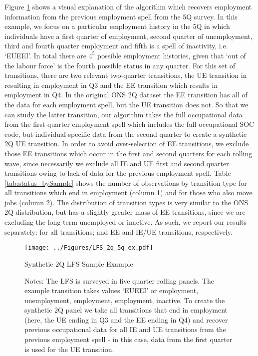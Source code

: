 \documentclass[12pt,authoryear]{elsarticle}
\begin{document}
		\vspace{2mm}
	
Figure \ref{fig:LFS_2q_5q} shows a visual explanation of the algorithm  which recovers employment information from the previous employment spell from the 5Q survey. In this example, we focus on a particular employment history in the 5Q in which individuals have a first quarter of employment, second quarter of unemployment, third and fourth quarter employment and fifth is a spell of inactivity, i.e. `EUEEI'. In total there are $4^5$ possible employment histories, given that `out of the labour force' is the fourth possible status in any quarter. For this set of transitions, there are two relevant two-quarter transitions, the UE transition in resulting in employment in Q3 and the EE transition which results in employment in Q4. In the original ONS 2Q dataset the EE transition has all of the data for each employment spell, but the UE transition does not. So that we can study the latter transition, our algorithm takes the full occupational data from the first quarter employment spell which includes the full occupational SOC code, but individual-specific data from the second quarter to create a synthetic 2Q UE transition.  In order to avoid over-selection of EE transitions, we exclude those EE transitions which occur in the first and second quarters for each rolling wave, since necessarily we exclude all IE and UE first and second quarter transitions owing to lack of data for the previous employment spell. Table \ref{tab:status_bySample} shows the number of observations by transition type for all transitions which end in employment (column 1) and for those who also move jobs (column 2). The distribution of transition types is very similar to the ONS 2Q distribution, but has a slightly greater mass of EE transitions, since we are excluding the long-term unemployed or inactive. As such, we report our results separately: for all transitions; and EE and IE/UE transitions, respectively. 
	
	
	

	\begin{figure}[H]
		\centering
		\texttt{[image: ../Figures/LFS\_2q\_5q\_ex.pdf]}
		\caption{Synthetic 2Q LFS Sample Example}
		\caption*{\footnotesize{Notes: The LFS is surveyed in five quarter rolling panels. The example transition takes values `EUEEI' or employment, unemployment, employment, employment, inactive. To create the synthetic 2Q panel we take all transitions that end in employment (here, the UE ending in Q3 and the EE ending in Q4) and recover previous occupational data for all IE and UE transitions from the previous employment spell - in this case, data from the first quarter is used for the UE transition.}}
		\label{fig:LFS_2q_5q}
	\end{figure}
\end{document}
